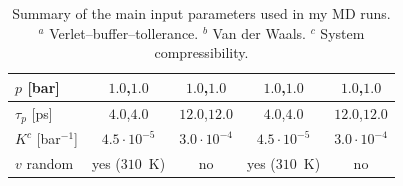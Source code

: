 \begin{table}[h!t]
\begin{tabular}{lcccc}
		$p$ [bar]			& $1.0$,$1.0$ & $1.0$,$1.0$ & $1.0$,$1.0$ & $1.0$,$1.0$ \\ \midrule
		$\tau_p$ [ps]		& $4.0$,$4.0$ & $12.0$,$12.0$ & $4.0$,$4.0$ & $12.0$,$12.0$ \\ \midrule
		$K^c$ [bar$^{-1}$]	& $4.5\cdot 10^{-5}$ & $3.0\cdot 10^{-4}$ & $4.5\cdot 10^{-5}$ & $3.0\cdot 10^{-4}$ \\ \midrule
		$v$ random			& yes ($310$~K) & no & yes ($310$~K) & no \\ \bottomrule 
	\end{tabular}
	\caption{Summary of the main input parameters used in my \acs{MD} runs. $^a$ Verlet--buffer--tollerance. $^b$ Van der Waals. $^c$ System compressibility.}
	\label{tab:inputParam}
\end{table}
